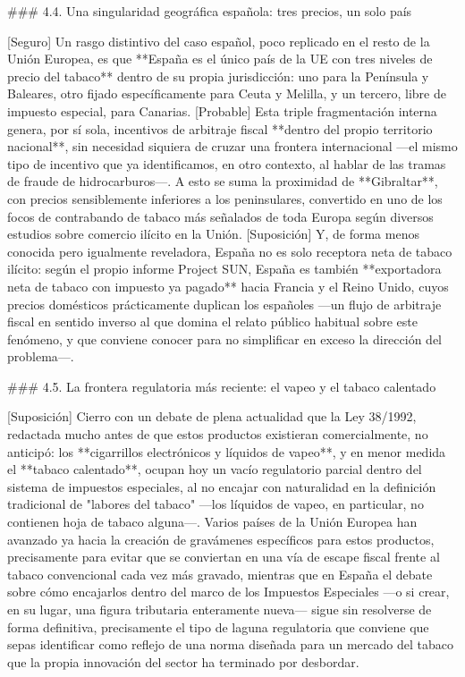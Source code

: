 \documentclass[10pt,a4paper]{article}
\begin{document}
### 4.4. Una singularidad geográfica española: tres precios, un solo país

[Seguro] Un rasgo distintivo del caso español, poco replicado en el resto de la Unión Europea, es que **España es el único país de la UE con tres niveles de precio del tabaco** dentro de su propia jurisdicción: uno para la Península y Baleares, otro fijado específicamente para Ceuta y Melilla, y un tercero, libre de impuesto especial, para Canarias. [Probable] Esta triple fragmentación interna genera, por sí sola, incentivos de arbitraje fiscal **dentro del propio territorio nacional**, sin necesidad siquiera de cruzar una frontera internacional —el mismo tipo de incentivo que ya identificamos, en otro contexto, al hablar de las tramas de fraude de hidrocarburos—. A esto se suma la proximidad de **Gibraltar**, con precios sensiblemente inferiores a los peninsulares, convertido en uno de los focos de contrabando de tabaco más señalados de toda Europa según diversos estudios sobre comercio ilícito en la Unión. [Suposición] Y, de forma menos conocida pero igualmente reveladora, España no es solo receptora neta de tabaco ilícito: según el propio informe Project SUN, España es también **exportadora neta de tabaco con impuesto ya pagado** hacia Francia y el Reino Unido, cuyos precios domésticos prácticamente duplican los españoles —un flujo de arbitraje fiscal en sentido inverso al que domina el relato público habitual sobre este fenómeno, y que conviene conocer para no simplificar en exceso la dirección del problema—.

### 4.5. La frontera regulatoria más reciente: el vapeo y el tabaco calentado

[Suposición] Cierro con un debate de plena actualidad que la Ley 38/1992, redactada mucho antes de que estos productos existieran comercialmente, no anticipó: los **cigarrillos electrónicos y líquidos de vapeo**, y en menor medida el **tabaco calentado**, ocupan hoy un vacío regulatorio parcial dentro del sistema de impuestos especiales, al no encajar con naturalidad en la definición tradicional de "labores del tabaco" —los líquidos de vapeo, en particular, no contienen hoja de tabaco alguna—. Varios países de la Unión Europea han avanzado ya hacia la creación de gravámenes específicos para estos productos, precisamente para evitar que se conviertan en una vía de escape fiscal frente al tabaco convencional cada vez más gravado, mientras que en España el debate sobre cómo encajarlos dentro del marco de los Impuestos Especiales —o si crear, en su lugar, una figura tributaria enteramente nueva— sigue sin resolverse de forma definitiva, precisamente el tipo de laguna regulatoria que conviene que sepas identificar como reflejo de una norma diseñada para un mercado del tabaco que la propia innovación del sector ha terminado por desbordar.
\end{document}
